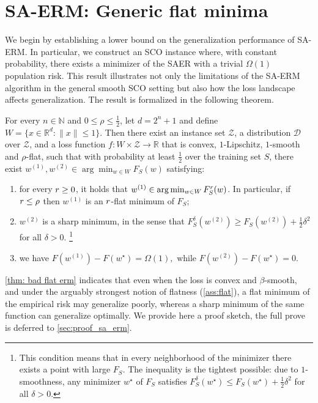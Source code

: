 
\section{SA-ERM: Generic flat minima}\label{sec:sa_erm}
We begin by establishing a lower bound on the generalization performance of SA-ERM.
In particular, we construct an SCO instance where, with constant probability, there exists a minimizer of the SAER with a trivial $\Omega(1)$ population risk. This result illustrates not only the limitations of the SA-ERM algorithm in the general smooth SCO setting but also how the loss landscape affects generalization.
The result is formalized in the following theorem.
\begin{theorem}\label{thm: bad flat erm}
For every $n \in \mathbb{N}$ and $0 \leq \rho \leq \tfrac{1}{2}$, let $d = 2^n + 1$ and define 
$W = \{x \in \mathbb{R}^d : \|x\| \leq 1\}$. Then there exist an instance set $\mathcal{Z}$, a distribution $\mathcal{D}$ over $\mathcal{Z}$, and a loss function 
$f : W \times \mathcal{Z} \to \mathbb{R}$ that is convex, $1$-Lipschitz, $1$-smooth and $\rho$-flat, such that with probability at least $\tfrac{1}{2}$ over the training set $S$, there exist 
$w^{(1)}, w^{(2)} \in \arg\min_{w \in W} F_S(w)$ satisfying:
\begin{enumerate}[label=(\roman*),leftmargin=*,parsep=0pt,topsep=0pt]
    \item 
    for every $r \geq 0$, it holds that $w^{(1)} \in \arg\min_{w \in W} F_S^{r}(w)$. In particular, if $r \leq \rho$ then $w^{(1)}$ is an $r$-flat minimum of $F_S$; 
    \item 
    $w^{(2)}$ is a sharp minimum, in the sense that  $F_S^{\delta}(w^{(2)}) \geq F_S(w^{(2)}) + \frac{1}{2}\delta^2$ for all $\delta > 0$.%
    \footnote{This condition means that in every neighborhood of the minimizer there exists a point with large $F_S$. The inequality is the tightest possible: due to $1$-smoothness, any minimizer $w^\star$ of $F_S$ satisfies $F_S^{\delta}(w^\star) \leq F_S(w^\star) + \tfrac{1}{2}\delta^2$ for all $\delta > 0$.}
    \item 
    we have $F(w^{(1)}) - F(w^\star) = \Omega(1), \text{ while } F(w^{(2)}) - F(w^\star) = 0.$
\end{enumerate}
\end{theorem}

\cref{thm: bad flat erm} indicates that even when the loss is convex and $\beta$-smooth, and under the arguably strongest notion of flatness (\cref{ass:flat}), a flat minimum of the empirical risk may generalize poorly, whereas a sharp minimum of the same function can generalize optimally. We provide here a proof sketch, the full prove is deferred to \cref{sec:proof_sa_erm}.





